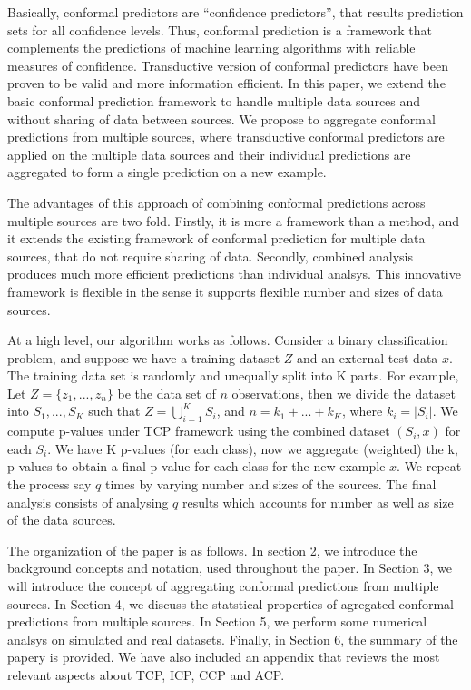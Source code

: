 \documentclass[main]{subfiles}
\begin{document}
Basically, conformal predictors are “confidence predictors”, that results prediction sets for all confidence levels. Thus, conformal prediction is a framework that complements the predictions of machine learning algorithms with reliable measures of confidence.
Transductive version of conformal predictors have been proven to be valid and more information efficient. In this paper, we extend the basic conformal prediction framework to handle multiple data sources and without sharing of data between sources. We propose to aggregate conformal predictions from multiple sources, where transductive conformal predictors are applied on the multiple data sources and their individual predictions are aggregated to form a single prediction on a new example.

The advantages of this approach of combining conformal predictions across multiple sources are two fold. 
Firstly, it is more a framework than a method, and it extends the existing framework of conformal prediction for multiple data sources, that do not require sharing of data. Secondly, combined analysis produces much more efficient predictions than individual analsys. This innovative framework is flexible in the sense it supports flexible number and sizes of data sources.

At a high level, our algorithm works as follows. Consider a binary classification problem, and suppose we have a training dataset $Z$ and an external test data $x$. The training data set is randomly and unequally split into K parts. For example, Let $Z = \{ z_1 , ..., z_n \} $ be the data set of $n$ observations, then we divide the dataset into $S_1, ..., S_K$ such that $Z = \bigcup_{i=1}^K S_i$, and $n = k_1+ ...+k_K$, where $k_i = |S_i|$. We compute p-values under TCP framework using the combined dataset  $(S_i,x)$ for each $S_i$. We have K p-values (for each class), now we aggregate (weighted) the k, p-values to obtain a final p-value for each class for the new example $x$. We repeat the process say $q$ times by varying number and sizes of the sources. The final analysis consists of analysing $q$ results which accounts for number as well as size of the data sources.


The organization of the paper is as follows. In section 2, we introduce the background concepts and notation, used throughout the paper. In Section 3, we will introduce the concept of aggregating conformal predictions from multiple sources. In Section 4, we discuss the statstical properties of agregated conformal predictions from multiple sources. In Section 5, we perform some numerical analsys on simulated and real datasets. Finally, in Section 6, the summary of the papery is provided.
We have also included an appendix that reviews the most relevant aspects about TCP, ICP, CCP and ACP.
\end{document}
